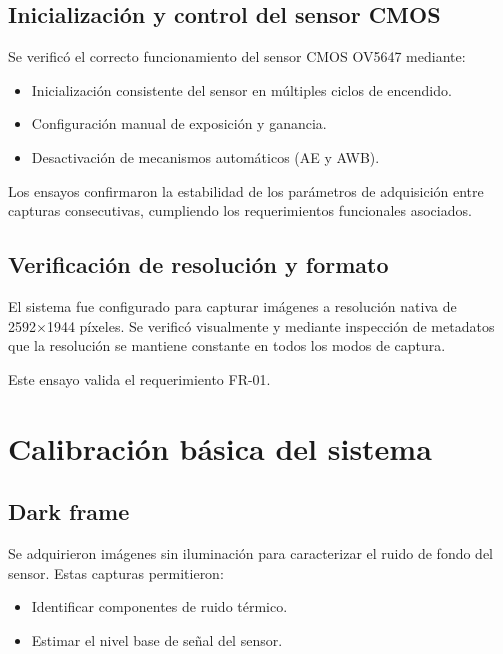 \subsection{Inicialización y control del sensor CMOS}

Se verificó el correcto funcionamiento del sensor CMOS OV5647 mediante:
\begin{itemize}
    \item Inicialización consistente del sensor en múltiples ciclos de encendido.
    \item Configuración manual de exposición y ganancia.
    \item Desactivación de mecanismos automáticos (AE y AWB).
\end{itemize}

Los ensayos confirmaron la estabilidad de los parámetros de adquisición entre
capturas consecutivas, cumpliendo los requerimientos funcionales asociados.

\subsection{Verificación de resolución y formato}

El sistema fue configurado para capturar imágenes a resolución nativa de
2592×1944 píxeles. Se verificó visualmente y mediante inspección de metadatos que
la resolución se mantiene constante en todos los modos de captura.

Este ensayo valida el requerimiento FR-01.

\section{Calibración básica del sistema}

\subsection{Dark frame}

Se adquirieron imágenes sin iluminación para caracterizar el ruido de fondo del
sensor. Estas capturas permitieron:
\begin{itemize}
    \item Identificar componentes de ruido térmico.
    \item Estimar el nivel base de señal del sensor.
\end{itemize}

